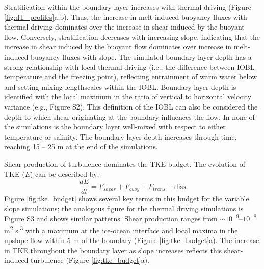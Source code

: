 \documentclass[draft]{agujournal2019}
\begin{document}
Stratification within the boundary layer increases with thermal driving (Figure \ref{fig:dT_profiles}a,b). Thus, the increase in melt-induced buoyancy fluxes with thermal driving dominates over the increase in shear induced by the buoyant flow. Conversely, stratification decreases with increasing slope, indicating that the increase in shear induced by the buoyant flow dominates over increase in melt-induced buoyancy fluxes with slope. The simulated boundary layer depth has a strong relationship with local thermal driving (i.e., the difference between IOBL temperature and the freezing point), reflecting entrainment of warm water below and setting mixing lengthscales  within the IOBL. Boundary layer depth is identified with the local maximum in the ratio of vertical to horizontal velocity variance (e.g., Figure S2). This definition of the IOBL can also be considered the depth to which shear originating at the boundary influences the flow. In none of the simulations is the boundary layer well-mixed with respect to either temperature or salinity. The boundary layer depth increases through time, reaching 15 -- 25 m at the end of the simulations. 

Shear production of turbulence dominates the TKE budget. The evolution of TKE ($E$) can be described by:
\begin{equation}
    \frac{dE}{dt} = F_{shear} + F_{buoy} + F_{trans} - \textrm{diss}
\end{equation}
Figure \ref{fig:tke_budget} shows several key terms in this budget for the variable slope simulations; the analogous figure for the thermal driving simulations is Figure S3 and shows similar patterns. Shear production ranges from $\sim 10^{-9} \textrm{--} 10^{-8}$ m\textsuperscript{2} s\textsuperscript{-3} with a maximum at the ice-ocean interface and local maxima in the upslope flow within 5 m of the boundary (Figure \ref{fig:tke_budget}a). The increase in TKE throughout the boundary layer as slope increases reflects this shear-induced turbulence (Figure \ref{fig:tke_budget}a).
\end{document}
